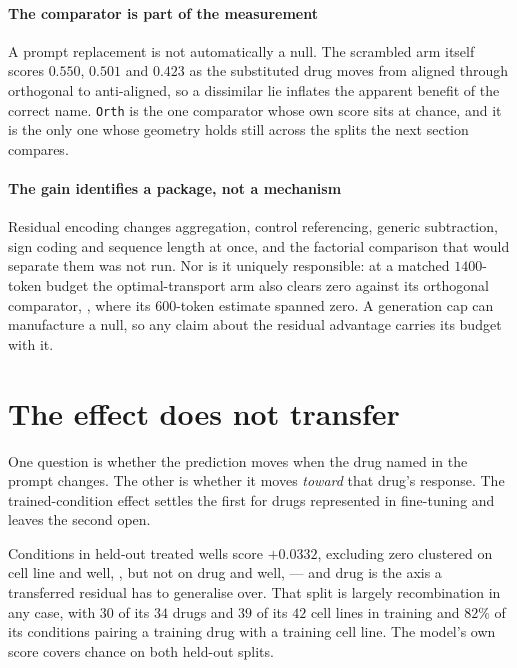 \paragraph{The comparator is part of the measurement} A prompt replacement is
not automatically a null. The scrambled arm itself scores $0.550$, $0.501$ and
$0.423$ as the substituted drug moves from aligned through orthogonal to
anti-aligned, so a dissimilar lie inflates the apparent benefit of the correct
name. \texttt{Orth} is the one comparator whose own score sits at chance, and it
is the only one whose geometry holds still across the splits the next section
compares.

\paragraph{The gain identifies a package, not a mechanism} Residual encoding
changes aggregation, control referencing, generic subtraction, sign coding and
sequence length at once, and the factorial comparison that would separate them
was not run. Nor is it uniquely responsible: at a matched $1400$-token budget the
optimal-transport arm also clears zero against its orthogonal comparator,
, where its $600$-token estimate spanned zero. A
generation cap can manufacture a null, so any claim about the residual advantage
carries its budget with it.

\section{The effect does not transfer}

One question is whether the prediction moves when the drug named in the prompt
changes. The other is whether it moves \emph{toward} that drug's response. The
trained-condition effect settles the first for drugs represented in fine-tuning
and leaves the second open.

Conditions in held-out treated wells score $+0.0332$, excluding zero clustered on
cell line and well, , but not on drug and well,
 --- and drug is the axis a transferred residual
has to generalise over. That split is largely recombination in any case, with
$30$ of its $34$ drugs and $39$ of its $42$ cell lines in training and $82\%$ of
its conditions pairing a training drug with a training cell line. The model's own
score covers chance on both held-out splits.

